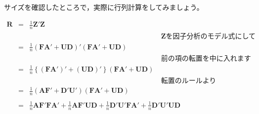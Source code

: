 \documentclass{ltjsbook}
\begin{document}
サイズを確認したところで，実際に行列計算をしてみましょう。

\begin{equation}
    \begin{array}{lll}
        \bm{R} & = & \frac{1}{n} \bm{Z}'\bm{Z}                                                                                                                                                      \\
               &   & \hspace{8cm}\text{$\bm{Z}$を因子分析のモデル式にして}                                                                                                                                       \\
               & = & \frac{1}{n}(\bm{F} \bm{A} ' + \bm{U} \bm{D})'(\bm{F} \bm{A} ' + \bm{U} \bm{D})                                                                                                 \\
               &   & \hspace{8cm}\text{前の項の転置を中に入れます}                                                                                                                                               \\
               & = & \frac{1}{n}\left \{ (\bm{F} \bm{A} ')'+(\bm{U} \bm{D})' \right \}(\bm{F} \bm{A} ' + \bm{U} \bm{D})                                                                             \\
               &   & \hspace{8cm}\text{転置のルールより}                                                                                                                                      \\
               & = & \frac{1}{n}(\bm{A} \bm{F} ' + \bm{D}' \bm{U} ')(\bm{F} \bm{A} ' + \bm{U} \bm{D})                                                                                               \\
               &   & \hspace{8cm}                                                                                                                                                                   \\
               & = & \frac{1}{n}\bm{A} \bm{F}' \bm{F} \bm{A}' + \frac{1}{n} \bm{A} \bm{F}' \bm{U} \bm{D} + \frac{1}{n} \bm{D}' \bm{U} ' \bm{F} \bm{A} ' + \frac{1}{n} \bm{D}' \bm{U}' \bm{U} \bm{D} \\
    \end{array}
\end{equation}
\end{document}
